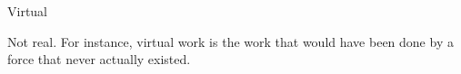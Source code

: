 Virtual

\par
Not real. For instance, virtual work is the work
that would have been done by a force that never
actually existed.